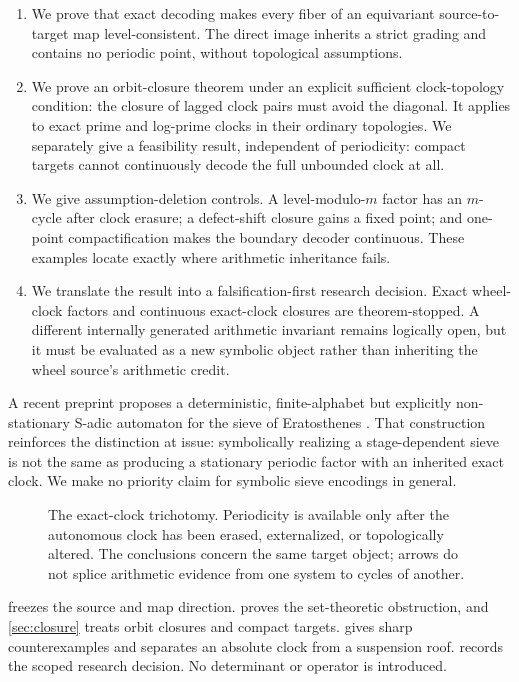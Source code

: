 \begin{enumerate}[label=\textbf{C\arabic*.}]
  \item We prove that exact decoding makes every fiber of an equivariant
  source-to-target map level-consistent.  The direct image inherits a strict
  grading and contains no periodic point, without topological assumptions.

  \item We prove an orbit-closure theorem under an explicit sufficient
  clock-topology
  condition: the closure of lagged clock pairs must avoid the diagonal.  It
  applies to exact prime and log-prime clocks in their ordinary topologies.
  We separately give a feasibility result, independent of periodicity:
  compact targets cannot continuously decode the full unbounded clock at
  all.

  \item We give assumption-deletion controls.  A level-modulo-$m$ factor has
  an $m$-cycle after clock erasure; a defect-shift closure gains a fixed
  point; and one-point compactification makes the boundary decoder
  continuous.  These examples locate exactly where arithmetic inheritance
  fails.

  \item We translate the result into a falsification-first research
  decision.  Exact wheel-clock factors and continuous exact-clock closures
  are theorem-stopped.  A different internally generated arithmetic
  invariant remains logically open, but it must be evaluated as a new
  symbolic object rather than inheriting the wheel source's arithmetic
  credit.
\end{enumerate}

A recent preprint proposes a deterministic, finite-alphabet but explicitly
non-stationary S-adic automaton for the sieve of Eratosthenes
\citep{heeren2026}.  That construction reinforces the distinction at issue:
symbolically realizing a stage-dependent sieve is not the same as producing
a stationary periodic factor with an inherited exact clock.  We make no
priority claim for symbolic sieve encodings in general.

\begin{figure}[t]
  \centering
  
  \caption{The exact-clock trichotomy.  Periodicity is available only after
  the autonomous clock has been erased, externalized, or topologically
  altered.  The conclusions concern the same target object; arrows do not
  splice arithmetic evidence from one system to cycles of another.}
  \label{fig:obstruction-map}
\end{figure}

 freezes the source and map direction.
 proves the set-theoretic obstruction, and
\cref{sec:closure} treats orbit closures and compact targets.
 gives sharp counterexamples and separates an absolute
clock from a suspension roof.   records the scoped
research decision.  No determinant or operator is introduced.
